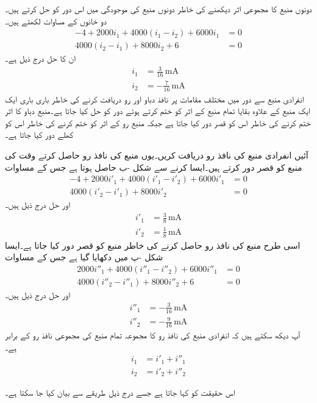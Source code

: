 دونوں منبع کا مجموعی اثر دیکھنے کی خاطر دونوں منبع کی موجودگی میں اس دور کو حل کرتے ہیں۔دو خانوں کے مساوات لکھتے ہیں۔
\begin{align*}
-4+2000i_1+4000(i_1-i_2)+6000i_1&=0\\
4000(i_2-i_1)+8000i_2+6&=0
\end{align*}
ان کا حل درج ذیل ہے۔
\begin{align*}
i_1&=\frac{3}{16}\, \si{\milli\ampere}\\
i_2&=-\frac{7}{16}\, \si{\milli\ampere}
\end{align*}
انفرادی منبع سے دور میں مختلف مقامات پر نافذ دباو اور رو دریافت کرنے کی خاطر باری باری ایک ایک منبع کے علاوہ بقایا تمام منبع کے اثر کو ختم کرتے ہوئے دور کو حل کیا جاتا ہے۔منبع دباو کا اثر ختم کرنے کی خاطر اس کو قصر دور کیا جاتا ہے جبکہ منبع رو کے اثر کو ختم کرنے کی خاطر اس کو کھلے دور کیا جاتا ہے۔

آئیں انفرادی منبع کی نافذ رو دریافت کریں۔یوں   منبع کی نافذ رو حاصل کرتے وقت  کی منبع کو قصر دور کرتے ہیں۔ایسا کرنے سے شکل -ب حاصل ہوتا ہے جس کے مساوات
\begin{align*}
-4+2000i'_1+4000(i'_1-i'_2)+6000i'_1&=0\\
4000(i'_2-i'_1)+8000i'_2&=0
\end{align*}
اور حل درج ذیل ہیں۔
\begin{align*}
i'_1&=\frac{3}{8}\, \si{\milli\ampere}\\
i'_2&=\frac{1}{8}\, \si{\milli\ampere}
\end{align*}
اسی طرح  منبع کی نافذ رو حاصل کرنے کی خاطر  منبع کو قصر دور کیا جاتا ہے۔ایسا شکل -پ میں دکھایا گیا ہے جس کے مساوات
\begin{align*}
2000i''_1+4000(i''_1-i''_2)+6000i''_1&=0\\
4000(i''_2-i''_1)+8000i''_2+6&=0
\end{align*}
اور حل درج ذیل ہیں۔
\begin{align*}
i''_1&=-\frac{3}{16}\, \si{\milli\ampere}\\
i''_2&=-\frac{9}{16}\, \si{\milli\ampere}
\end{align*}
آپ دیکھ سکتے ہیں کہ انفرادی منبع کی نافذ رو  کا مجموعہ تمام منبع کی مجموعی نافذ رو کے برابر ہے۔
\begin{align*}
i_1&=i'_1+i''_1\\
i_2&=i'_2+i''_2
\end{align*}

اس حقیقت کو  کہا جاتا ہے  جسے درج ذیل طریقے سے بیان کیا جا سکتا ہے۔

